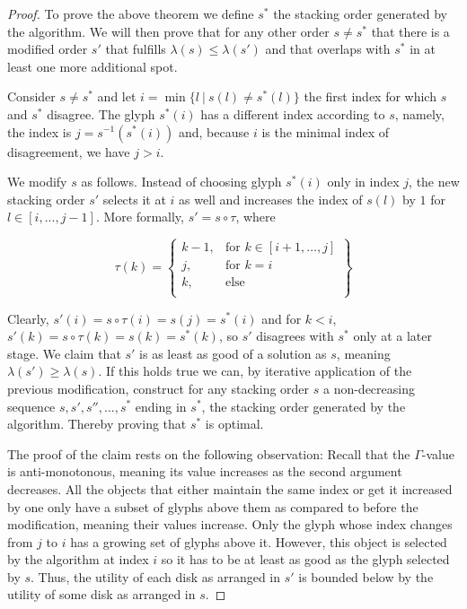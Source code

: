 \documentclass[a4paper,11pt]{article}
\begin{document}
\begin{proof}
  To prove the above theorem we define $s^*$ the stacking order generated by the algorithm. We will then prove that for any other order $s\neq s^*$ that there is a modified order $s'$ that fulfills $\lambda(s)\leq\lambda(s')$ and that overlaps with $s^*$ in at least one more additional spot.

  Consider $s\neq s^*$ and let $i=\min\{l\ |\ s(l)\neq s^*(l)\}$ the first index for which $s$ and $s^*$ disagree. The glyph $s^*(i)$ has a different index according to $s$, namely, the index is $j=s^{-1}(s^*(i))$ and, because $i$ is the minimal index of disagreement, we have $j>i$.

  We modify $s$ as follows. Instead of choosing glyph $s^*(i)$ only in index $j$, the new stacking order $s'$ selects it at $i$ as well and increases the index of $s(l)$ by $1$ for $l\in [i,...,j-1]$. More formally, $s'=s\circ \tau$, where

  \[
    \tau(k) = \left\{\begin{array}{ll}
      k-1, & \text{for } k\in [i+1,\dots,j] \\
      j,   & \text{for } k=i                \\
      k,   & \text{else}                    \\
    \end{array}\right\}
  \]

  Clearly, $s'(i) = s\circ\tau(i) = s(j) = s^*(i)$ and for $k<i$, $s'(k) = s\circ\tau(k) = s(k) = s^*(k)$, so $s'$ disagrees with $s^*$ only at a later stage. We claim that $s'$ is as least as good of a solution as $s$, meaning $\lambda(s')\geq\lambda(s)$. If this holds true we can, by iterative application of the previous modification, construct for any stacking order $s$ a non-decreasing sequence $s, s', s'', \dots, s^*$ ending in $s^*$, the stacking order generated by the algorithm. Thereby proving that $s^*$ is optimal.

  The proof of the claim rests on the following observation: Recall that the $\Gamma$-value is anti-monotonous, meaning its value increases as the second argument decreases. All the objects that either maintain the same index or get it increased by one only have a subset of glyphs above them as compared to before the modification, meaning their values increase. Only the glyph whose index changes from $j$ to $i$ has a growing set of glyphs above it. However, this object is selected by the algorithm at index $i$ so it has to be at least as good as the glyph selected by $s$. Thus, the utility of each disk as arranged in $s'$ is bounded below by the utility of some disk as arranged in $s$.


\end{proof}
\end{document}
